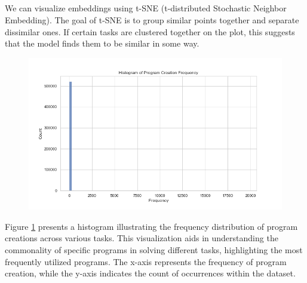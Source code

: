 \subsection{}
We can visualize embeddings using  t-SNE (t-distributed Stochastic Neighbor Embedding). The goal of t-SNE is to group similar points together and separate dissimilar ones. If certain tasks are clustered together on the plot, this suggests that the model finds them to be similar in some way.






\begin{figure}[H]
    \centering
    \includegraphics[width=\textwidth]{../img/plot_program_creation_frequency.png}
    \caption{}
    \label{fig:program_creation_frequency}
\end{figure}
Figure \ref{fig:program_creation_frequency} presents a histogram illustrating the frequency distribution of program creations across various tasks. This visualization aids in understanding the commonality of specific programs in solving different tasks, highlighting the most frequently utilized programs. The x-axis represents the frequency of program creation, while the y-axis indicates the count of occurrences within the dataset.




